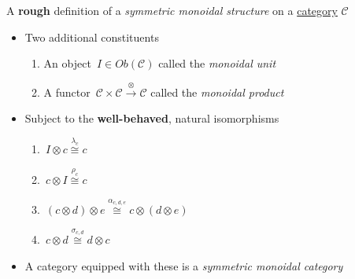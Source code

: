A \textbf{rough} definition of a \emph{symmetric monoidal structure} on a \href{doc/1 math/Seven Sketches in Compositionality/Chapter 3: Databases/2 Categories/1 Free Categories/1 Category}{category} $\mathcal{C}$

\begin{itemize}
    \item Two additional constituents
          \begin{enumerate}
            \item An object \,$I \in Ob(\mathcal{C})$ called the \emph{monoidal unit}\,
            \item A functor \,$\mathcal{C}\times \mathcal{C}\xrightarrow{\otimes}\mathcal{C}$ called the \emph{monoidal product}\,
          \end{enumerate}
    \item Subject to the \textbf{well-behaved}, natural isomorphisms
          \begin{enumerate}
            \item \,$I \otimes c \overset{\lambda_c}\cong c$\,
            \item \,$c \otimes I \overset{\rho_c}\cong c$\,
            \item \,$(c \otimes d)\otimes e \overset{\alpha_{c,d,e}}\cong c \otimes (d\otimes e)$\,
            \item \,$c \otimes d \overset{\sigma_{c,d}}\cong d \otimes c$\,
          \end{enumerate}
    \item A category equipped with these is a \emph{symmetric monoidal category}
  \end{itemize}
